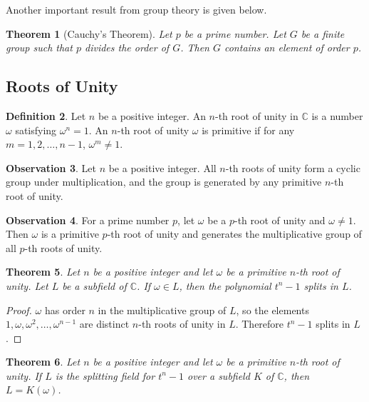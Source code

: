 \documentclass[12pt]{article}
\newtheorem{theorem}{Theorem}
\theoremstyle{definition}
\newtheorem{definition}[theorem]{Definition}
\newtheorem{observation}[theorem]{\textbf{Observation}}
\begin{document}
Another important result from group theory is given below.

\begin{theorem}[Cauchy's Theorem] \label{thm:cauchy}
    Let $p$ be a prime number. Let $G$ be a finite group such that $p$ divides the order of $G$. Then $G$ contains an element of order $p$. 
\end{theorem}

\subsection{Roots of Unity}
\begin{definition}
    Let $n$ be a positive integer. An $n$-th root of unity in $\mathbb C$ is a number $\omega$ satisfying $\omega ^ n = 1$. An $n$-th root of unity $\omega$ is primitive if for any $m = 1, 2, \dots, n - 1$, $\omega ^ m \neq 1$.
\end{definition}

\begin{observation}
    Let $n$ be a positive integer. All $n$-th roots of unity form a cyclic group under multiplication, and the group is generated by any primitive $n$-th root of unity.
\end{observation}

\begin{observation}
    For a prime number $p$, let $\omega$ be a $p$-th root of unity and $\omega \neq 1$. Then $\omega$ is a primitive $p$-th root of unity and generates the multiplicative group of all $p$-th roots of unity.
\end{observation}

\begin{theorem} \label{thm:unity-1}
    Let $n$ be a positive integer and let $\omega$ be a primitive $n$-th root of unity. Let $L$ be a subfield of $\mathbb C$. If $\omega \in L$, then the polynomial $t^n - 1$ splits in $L$.
\end{theorem}
\begin{proof}
    $\omega$ has order $n$ in the multiplicative group of $L$, so the elements $1, \omega, \omega^2, \ldots, \omega^{n-1}$ are distinct $n$-th roots of unity in $L$. Therefore $t^n-1$ splits in $L$.
\end{proof}

\begin{theorem} \label{thm:unity-2}
    Let $n$ be a positive integer and let $\omega$ be a primitive $n$-th root of unity. If $L$ is the splitting field for $t^n - 1$ over a subfield $K$ of $\mathbb C$, then $L = K(\omega)$.
\end{theorem}
\end{document}
